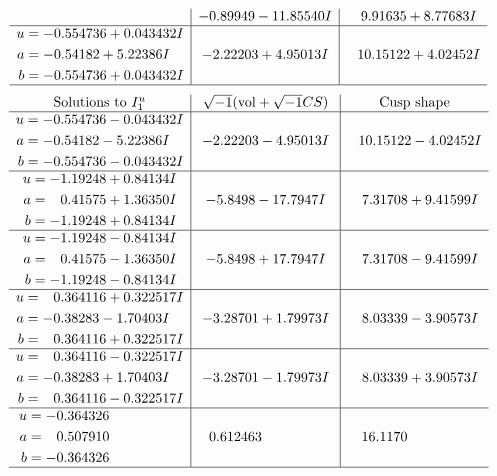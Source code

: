 \documentclass[1p]{elsarticle_modified}
\theoremstyle{definition}
\newcommand{\I}{\sqrt{-1}}
\begin{document}
$$\begin{array}{c|c|c}
 & -0.89949 - 11.85540 I & \phantom{-}9.91635 + 8.77683 I \\ \hline\begin{aligned}
u &= -0.554736 + 0.043432 I \\
a &= -0.54182 + 5.22386 I \\
b &= -0.554736 + 0.043432 I\end{aligned}
 & -2.22203 + 4.95013 I & \phantom{-}10.15122 + 4.02452 I\\
 \hline 
 \end{array}$$\newpage$$\begin{array}{c|c|c}  
\text{Solutions to }I^u_{1}& \I (\text{vol} + \sqrt{-1}CS) & \text{Cusp shape}\\
 \hline 
\begin{aligned}
u &= -0.554736 - 0.043432 I \\
a &= -0.54182 - 5.22386 I \\
b &= -0.554736 - 0.043432 I\end{aligned}
 & -2.22203 - 4.95013 I & \phantom{-}10.15122 - 4.02452 I \\ \hline\begin{aligned}
u &= -1.19248 + 0.84134 I \\
a &= \phantom{-}0.41575 + 1.36350 I \\
b &= -1.19248 + 0.84134 I\end{aligned}
 & -5.8498 - 17.7947 I & \phantom{-}7.31708 + 9.41599 I \\ \hline\begin{aligned}
u &= -1.19248 - 0.84134 I \\
a &= \phantom{-}0.41575 - 1.36350 I \\
b &= -1.19248 - 0.84134 I\end{aligned}
 & -5.8498 + 17.7947 I & \phantom{-}7.31708 - 9.41599 I \\ \hline\begin{aligned}
u &= \phantom{-}0.364116 + 0.322517 I \\
a &= -0.38283 - 1.70403 I \\
b &= \phantom{-}0.364116 + 0.322517 I\end{aligned}
 & -3.28701 + 1.79973 I & \phantom{-}8.03339 - 3.90573 I \\ \hline\begin{aligned}
u &= \phantom{-}0.364116 - 0.322517 I \\
a &= -0.38283 + 1.70403 I \\
b &= \phantom{-}0.364116 - 0.322517 I\end{aligned}
 & -3.28701 - 1.79973 I & \phantom{-}8.03339 + 3.90573 I \\ \hline\begin{aligned}
u &= -0.364326\phantom{ +0.000000I} \\
a &= \phantom{-}0.507910\phantom{ +0.000000I} \\
b &= -0.364326\phantom{ +0.000000I}\end{aligned}
 & \phantom{-}0.612463\phantom{ +0.000000I} & \phantom{-}16.1170\phantom{ +0.000000I}\\
 \hline 
 \end{array}$$\newpage\newpage\renewcommand{\arraystretch}{1}
\end{document}
